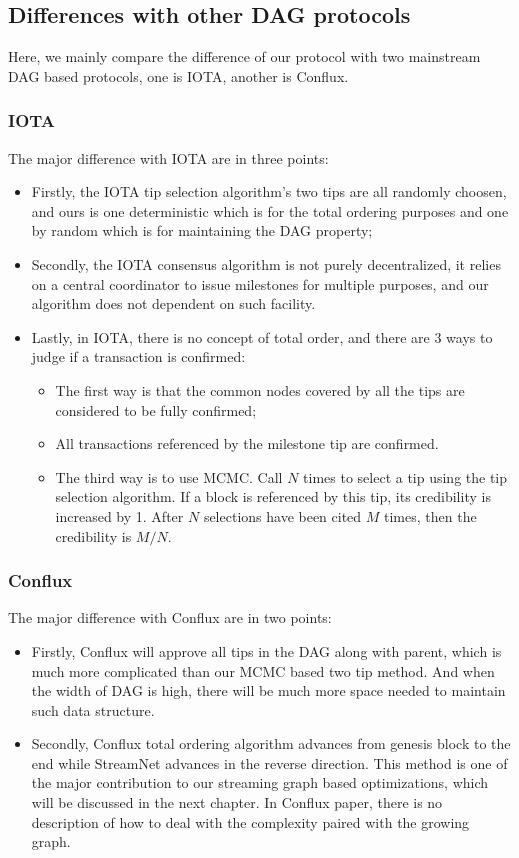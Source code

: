 \subsection{Differences with other DAG protocols}
Here, we mainly compare the difference of our protocol with two mainstream DAG based protocols, one is IOTA, another is Conflux.

\subsubsection{IOTA}
The major difference with IOTA are in three points:
\begin{itemize}
    \item Firstly, the IOTA tip selection algorithm's two tips are all randomly choosen, 
        and ours is one deterministic which is for the total ordering purposes and one by random which is for maintaining the DAG property; 
    \item Secondly, the IOTA consensus algorithm is not purely decentralized, 
        it relies on a central coordinator to issue milestones for multiple purposes, and our algorithm does not dependent on such facility. 
    \item Lastly, in IOTA, there is no concept of total order,
        and there are 3 ways to judge if a transaction is confirmed: 
    \begin{itemize}
        \item The first way is that the common nodes covered by all the tips are considered to be fully confirmed; 
        \item All transactions referenced by the milestone tip are confirmed.
        \item The third way is to use MCMC.
            Call $N$ times to select a tip using the tip selection algorithm.
            If a block is referenced by this tip, its credibility is increased by 1.
            After $N$ selections have been cited $M$ times, then the credibility is $M / N$.
    \end{itemize}
\end{itemize}

\subsubsection{Conflux}
The major difference with Conflux are in two points:
\begin{itemize}
    \item Firstly, Conflux will approve all tips in the DAG along with parent, which is much more complicated than our MCMC based two tip method. 
        And when the width of DAG is high, there will be much more space needed to maintain such data structure. 
    \item Secondly, Conflux total ordering algorithm advances from genesis block to the end while StreamNet advances in the reverse direction. 
        This method is one of the major contribution to our streaming graph based optimizations,
        which will be discussed in the next chapter. 
        In Conflux paper, there is no description of how to deal with the complexity paired with the growing graph.
\end{itemize}
